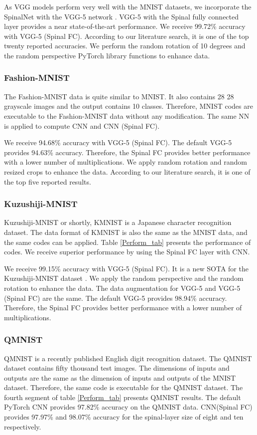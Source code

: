\documentclass[journal]{IEEEtran}
\begin{document}
As VGG models perform very well with the MNIST datasets, we incorporate the SpinalNet with the VGG-5 network \cite{VGG5}. VGG-5 with the Spinal fully connected layer provides a near state-of-the-art performance. We receive 99.72\% accuracy with VGG-5 (Spinal FC). According to our literature search, it is one of the top twenty reported accuracies. We perform the random rotation of 10 degrees and the random perspective PyTorch library functions to enhance data. 


\subsubsection{Fashion-MNIST}
The Fashion-MNIST data is quite similar to MNIST. It also contains 28  28 grayscale images and the output contains 10 classes. Therefore, MNIST codes are executable to the Fashion-MNIST data without any modification. The same NN is applied to compute CNN and CNN (Spinal FC).  

We receive 94.68\% accuracy with VGG-5 (Spinal FC). The default VGG-5 provides 94.63\% accuracy. Therefore, the Spinal FC provides better performance with a lower number of multiplications. We apply random rotation and random resized crops to enhance the data. According to our literature search, it is one of the top five reported results.



\subsubsection{Kuzushiji-MNIST}
Kuzushiji-MNIST or shortly, KMNIST is a Japanese character recognition dataset. The data format of KMNIST is also the same as the MNIST data, and the same codes can be applied. Table \ref{Perform_tab} presents the performance of codes. We receive superior performance by using the Spinal FC layer with CNN.

We receive 99.15\% accuracy with VGG-5 (Spinal FC). 
It is a new SOTA for the Kuzushiji-MNIST dataset \cite{nokland2019training,tissera2019context}. We apply the random perspective and the random rotation to enhance the data.
The data augmentation for VGG-5 and VGG-5  (Spinal FC) are the same. The default VGG-5 provides 98.94\% accuracy. Therefore, the Spinal FC provides better performance with a lower number of multiplications. 


\subsubsection{QMNIST}
QMNIST is a recently published English digit recognition dataset. The QMNIST dataset contains fifty thousand test images. The dimensions of inputs and outputs are the same as the dimension of inputs and outputs of the MNIST dataset. Therefore, the same code is executable for the QMNIST dataset. The fourth segment of table \ref{Perform_tab} presents QMNIST results. The default PyTorch CNN provides 97.82\% accuracy on the QMNIST data. CNN(Spinal FC) provides 97.97\% and 98.07\% accuracy for the spinal-layer size of eight and ten respectively. 
\end{document}
